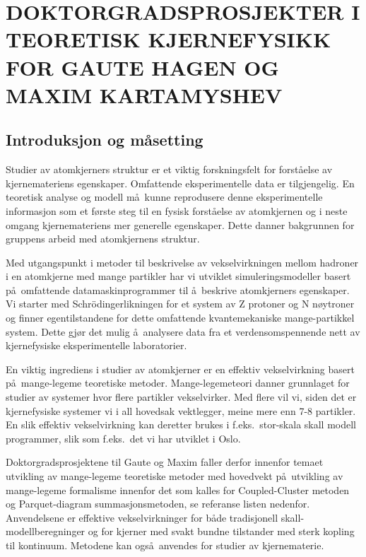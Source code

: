 
\pagestyle{plain}

\section*{DOKTORGRADSPROSJEKTER
I TEORETISK KJERNEFYSIKK FOR GAUTE HAGEN OG MAXIM KARTAMYSHEV }

\subsection*{Introduksjon og m\aa setting}

Studier av atomkjerners struktur er et viktig forskningsfelt for
forst\aa else av kjernemateriens egenskaper. Omfattende eksperimentelle
data er tilgjengelig. En teoretisk analyse og modell m\aa\  kunne
reprodusere denne eksperimentelle informasjon som et f\o rste steg til
en fysisk forst\aa else av atomkjernen og i neste omgang kjernemateriens mer
generelle egenskaper. Dette danner bakgrunnen for gruppens arbeid med
atomkjernens struktur.

Med utgangspunkt i metoder til beskrivelse av vekselvirkningen
mellom hadroner i en atomkjerne med mange partikler har vi utviklet
simuleringsmodeller basert p\aa\ omfattende datamaskinprogrammer til \aa\
beskrive atomkjerners egenskaper. Vi starter med
Schr\"{o}dingerlikningen for et system av Z protoner og N n\o ytroner
og finner egentilstandene for dette omfattende kvantemekaniske
mange-partikkel system. Dette gj\o r det mulig \aa\ analysere data fra
et verdensomspennende nett av kjernefysiske eksperimentelle laboratorier.

En viktig ingrediens i studier av atomkjerner er en effektiv
vekselvirkning basert p\aa\ mange-legeme teoretiske metoder.
Mange-legemeteori
danner grunnlaget for studier av systemer hvor
flere partikler vekselvirker. Med flere vil vi, siden
det er kjernefysiske systemer vi i all hovedsak vektlegger,
meine mere enn 7-8 partikler.
En slik effektiv vekselvirkning kan deretter brukes i f.eks.~stor-skala
skall modell programmer, slik som f.eks.~det vi har utviklet i Oslo.

Doktorgradsprosjektene til Gaute og Maxim  faller derfor innenfor 
temaet utvikling av mange-legeme teoretiske metoder med hovedvekt p\aa\
utvikling av mange-legeme formalisme innenfor det som kalles
for 
Coupled-Cluster metoden og Parquet-diagram summasjonsmetoden, 
se referanse listen nedenfor.
Anvendelsene er effektive vekselvirkninger for b\aa de tradisjonell 
skall-modellberegninger og for kjerner med svakt bundne tilstander 
med sterk kopling til kontinuum. Metodene kan ogs\aa\ anvendes for studier
av kjernematerie. 

